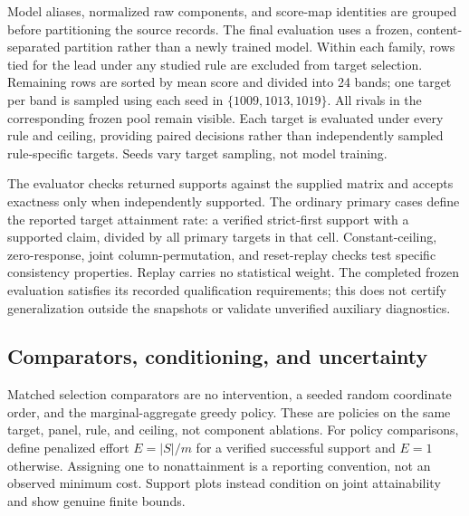 \documentclass{article}
\begin{document}
Model aliases, normalized raw components, and score-map identities are grouped before partitioning the source records. The final evaluation uses a frozen, content-separated partition rather than a newly trained model. Within each family, rows tied for the lead under any studied rule are excluded from target selection. Remaining rows are sorted by mean score and divided into 24 bands; one target per band is sampled using each seed in $\{1009,1013,1019\}$. All rivals in the corresponding frozen pool remain visible. Each target is evaluated under every rule and ceiling, providing paired decisions rather than independently sampled rule-specific targets. Seeds vary target sampling, not model training.

The evaluator checks returned supports against the supplied matrix and accepts exactness only when independently supported. The ordinary primary cases define the reported target attainment rate: a verified strict-first support with a supported claim, divided by all primary targets in that cell. Constant-ceiling, zero-response, joint column-permutation, and reset-replay checks test specific consistency properties. Replay carries no statistical weight. The completed frozen evaluation satisfies its recorded qualification requirements; this does not certify generalization outside the snapshots or validate unverified auxiliary diagnostics.

\subsection{Comparators, conditioning, and uncertainty}
Matched selection comparators are no intervention, a seeded random coordinate order, and the marginal-aggregate greedy policy. These are policies on the same target, panel, rule, and ceiling, not component ablations. For policy comparisons, define penalized effort $E=|S|/m$ for a verified successful support and $E=1$ otherwise. Assigning one to nonattainment is a reporting convention, not an observed minimum cost. Support plots instead condition on joint attainability and show genuine finite bounds.
\end{document}
